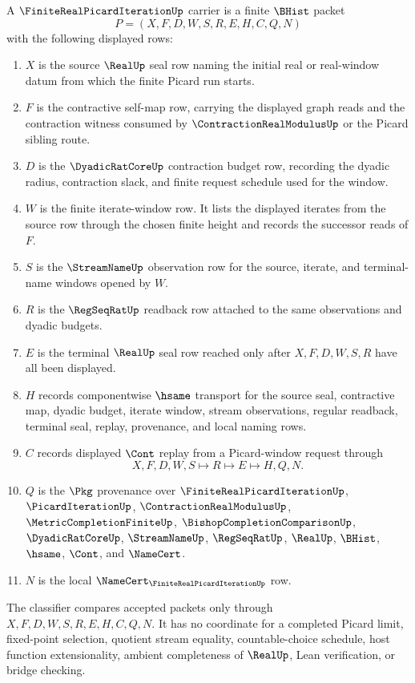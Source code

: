 \begin{definition}
\label{def:finite-real-picard-iteration-carrier}
A $\FiniteRealPicardIterationUp$ carrier is a finite $\BHist$ packet
$$
P=(X,F,D,W,S,R,E,H,C,Q,N)
$$
with the following displayed rows:
\begin{enumerate}
\item $X$ is the source $\RealUp$ seal row naming the initial real or real-window datum from which the finite Picard run starts.
\item $F$ is the contractive self-map row, carrying the displayed graph reads and the contraction witness consumed by $\ContractionRealModulusUp$ or the Picard sibling route.
\item $D$ is the $\DyadicRatCoreUp$ contraction budget row, recording the dyadic radius, contraction slack, and finite request schedule used for the window.
\item $W$ is the finite iterate-window row. It lists the displayed iterates from the source row through the chosen finite height and records the successor reads of $F$.
\item $S$ is the $\StreamNameUp$ observation row for the source, iterate, and terminal-name windows opened by $W$.
\item $R$ is the $\RegSeqRatUp$ readback row attached to the same observations and dyadic budgets.
\item $E$ is the terminal $\RealUp$ seal row reached only after $X,F,D,W,S,R$ have all been displayed.
\item $H$ records componentwise $\hsame$ transport for the source seal, contractive map, dyadic budget, iterate window, stream observations, regular readback, terminal seal, replay, provenance, and local naming rows.
\item $C$ records displayed $\Cont$ replay from a Picard-window request through
$$
X,F,D,W,S \longmapsto R \longmapsto E \longmapsto H,Q,N .
$$
\item $Q$ is the $\Pkg$ provenance over $\FiniteRealPicardIterationUp$, $\PicardIterationUp$, $\ContractionRealModulusUp$, $\MetricCompletionFiniteUp$, $\BishopCompletionComparisonUp$, $\DyadicRatCoreUp$, $\StreamNameUp$, $\RegSeqRatUp$, $\RealUp$, $\BHist$, $\hsame$, $\Cont$, and $\NameCert$.
\item $N$ is the local $\NameCert_{\FiniteRealPicardIterationUp}$ row.
\end{enumerate}
The classifier compares accepted packets only through $X,F,D,W,S,R,E,H,C,Q,N$. It has no coordinate for a completed Picard limit, fixed-point selection, quotient stream equality, countable-choice schedule, host function extensionality, ambient completeness of $\RealUp$, Lean verification, or bridge checking.
\end{definition}

